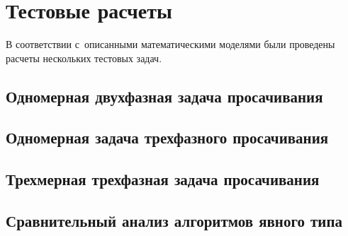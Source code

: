 \chapter{Тестовые расчеты} \label{ch:ch3}

В соответствии с~описанными математическими моделями были проведены расчеты
нескольких тестовых задач.

\section{Одномерная двухфазная задача просачивания} \label{ch:ch3/sect1}

\section{Одномерная задача трехфазного просачивания} \label{ch:ch3/sect2}

\section{Трехмерная трехфазная задача просачивания} \label{ch:ch3/sect3}

\section{Сравнительный анализ алгоритмов явного типа} \label{ch:ch3/sect4}
